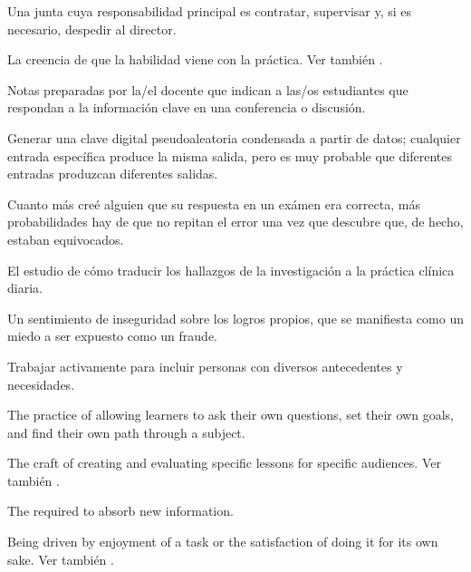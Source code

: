 \begin{description}
 Una junta cuya responsabilidad principal es
contratar, supervisar y, si es necesario, despedir al director.

 La creencia de que la habilidad 
viene con la práctica. Ver también .

 Notas preparadas por la/el docente que indican a las/os 
estudiantes que respondan a la información clave en una conferencia o discusión.

 Generar una clave digital pseudoaleatoria condensada a partir de datos; cualquier entrada específica produce la misma salida, pero es muy probable que diferentes entradas produzcan diferentes salidas.

 Cuanto más creé alguien 
que su respuesta en un exámen era correcta, más probabilidades hay de que no 
repitan el error una vez que descubre que, de hecho, estaban equivocados.

 El estudio de cómo traducir 
los hallazgos de la investigación a la práctica clínica diaria.

 Un sentimiento de inseguridad sobre 
los logros propios, que se manifiesta como un miedo a ser expuesto como un fraude.

 Trabajar activamente para incluir 
personas con diversos antecedentes y necesidades.

 The practice of
allowing learners to ask their own questions, set their own goals, and find
their own path through a subject.

 The craft of creating and
evaluating specific lessons for specific audiences. Ver también
.

 The 
required to absorb new information.

 Being driven by enjoyment
of a task or the satisfaction of doing it for its own sake.  Ver también
.


\end{description}
